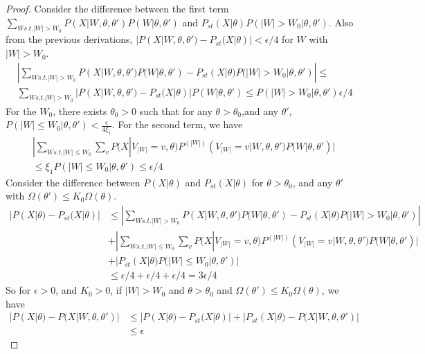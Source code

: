 \begin{proof}
Consider the difference between the first term $\sum_{W s.t. |W| > W_0} P(X | W, \theta, \theta') P(W | \theta, \theta')$ and $P_{st}(X | \theta)P(|W| > W_0 | \theta, \theta')$. Also from the previous derivations, $|P(X| W, \theta, \theta') - P_{st}(X | \theta)| < \epsilon / 4$ for $W$ with $|W| > W_0$.\\
\begin{align*}
&|\sum_{W s.t. |W| > W_0} P(X | W, \theta, \theta') P(W | \theta, \theta')  - P_{st}(X | \theta)P(|W| > W_0 | \theta, \theta')|  \leq  \\
&\sum_{W s.t. |W| > W_0} |P(X | W, \theta, \theta') - P_{st}(X | \theta)|  P(W | \theta, \theta') \leq P(|W| > W_0 | \theta, \theta') \epsilon / 4 
\end{align*}
For the $W_0$, there exists $\theta_0 > 0$ such that for any $\theta > \theta_0$,and any $\theta'$, $P(|W| \leq W_0 | \theta, \theta') < \frac{\epsilon}{4\xi_1}.$
For the second term, we have 
\begin{align*}
&|\sum_{W s.t. |W| \leq W_0} \sum_{v} P(X | V_{|W|} = v, \theta) P^{(|W|)}(V_{|W|} = v | W, \theta, \theta') P(W|\theta, \theta')|  \\
&\leq \xi_1 P(|W| \leq W_0 | \theta, \theta') \leq \epsilon / 4
\end{align*}
Consider the difference between $P(X|\theta)$ and $P_{st}(X|\theta)$ for $\theta > \theta_0$, and any $\theta'$ with $\Omega(\theta') \le K_0\Omega(\theta)$.
\begin{align*}
|P(X|\theta) - P_{st}(X|\theta)| &\leq |\sum_{W s.t. |W| > W_0} P(X | W, \theta, \theta') P(W | \theta, \theta')  - P_{st}(X | \theta)P(|W| > W_0 |\theta, \theta')| \\
&+ |\sum_{W s.t. |W| \leq W_0} \sum_{v} P(X | V_{|W|} = v, \theta) P^{(|W|)}(V_{|W|} = v | W, \theta, \theta') P(W|\theta, \theta')|\\
&+ |P_{st}(X | \theta)P(|W| \leq W_0 | \theta, \theta')|\\
&\leq \epsilon / 4 + \epsilon / 4 + \epsilon / 4 = 3\epsilon/4
\end{align*}
So for $\epsilon > 0$, and $K_0 > 0$, if $|W| > W_0$ and $\theta > \theta_0$ and $\Omega(\theta') \leq K_0 \Omega(\theta)$, we have 
\begin{align*}
|P(X | \theta) - P(X | W, \theta, \theta')| &\leq |P(X | \theta) -P_{st}(X | \theta) | + | P_{st}(X | \theta) -  P(X | W, \theta, \theta')|\\
& \leq \epsilon
\end{align*}

\end{proof}

